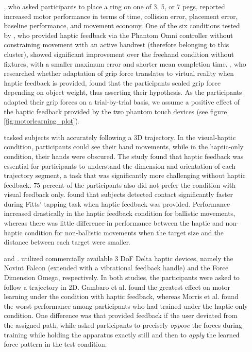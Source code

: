 \cite{Brickler2019}, who asked participants to place a ring on one of 3, 5, or 7 pegs, reported increased motor performance in terms of time, collision error, placement error, baseline performance, and movement economy. One of the six conditions tested by \cite{Fehlberg2012}, who provided haptic feedback via the Phantom Omni controller without constraining movement with an active handrest (therefore belonging to this cluster), showed significant improvement over the freehand condition without fixtures, with a smaller maximum error and shorter mean completion time. \cite{Gunter2022}, who researched whether adaptation of grip force translates to virtual reality when haptic feedback is provided, found that the participants scaled grip force depending on object weight, thus asserting their hypothesis. As the participants adapted their grip forces on a trial-by-trial basis, we assume a positive effect of the haptic feedback provided by the two phantom touch devices (see figure \ref{fig:motorlearning_plot}). 

\cite{Rodriguez2010} tasked subjects with accurately following a 3D trajectory. In the visual-haptic condition, participants could see their hand movements, while in the haptic-only condition, their hands were obscured. The study found that haptic feedback was essential for participants to understand the dimension and orientation of each trajectory segment, a task that was significantly more challenging without haptic feedback. 75 percent of the participants also did not prefer the condition with visual feedback only. 
\cite{Wall2000} found that subjects detected contact significantly faster during Fitts' tapping task when haptic feedback was provided. Performance increased drastically in the haptic feedback condition for ballistic movements, whereas there was little difference in performance between the haptic and non-haptic condition for non-ballistic movements when the target size and the distance between each target were smaller.

\cite{Gambaro2014} and \cite{Morris2007}. utilized commercially available 3 DoF Delta haptic devices, namely the Novint Falcon (extended with a vibrational feedback handle) and the Force Dimension Omega, respectively. In both studies, the participants were asked to follow a trajectory in 2D. Gambaro et al. found the greatest effect on motor learning under the condition with haptic feedback, whereas Morris et al. found the worst performance among participants who had trained under the haptic-only condition. One difference was that \cite{Gambaro2014} provided feedback if the user deviated from the assigned path, while \cite{Morris2007} asked participants to precisely \textit{oppose} the forces during training while holding the apparatus exactly still and then to \textit{apply} the learned force pattern in the test condition. 


